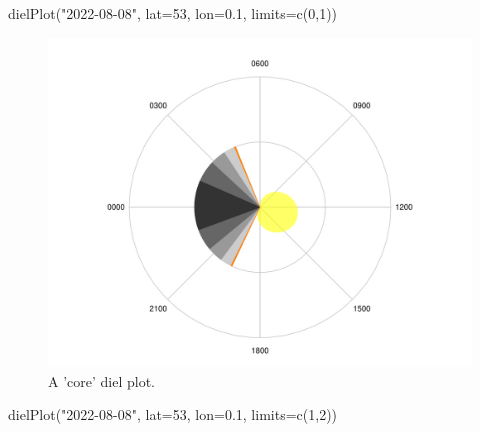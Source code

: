 \documentclass[
]{book}
\newenvironment{Shaded}{\begin{snugshade}}{\end{snugshade}}
\newcommand{\AttributeTok}[1]{\textcolor[rgb]{0.77,0.63,0.00}{#1}}
\newcommand{\DecValTok}[1]{\textcolor[rgb]{0.00,0.00,0.81}{#1}}
\newcommand{\FloatTok}[1]{\textcolor[rgb]{0.00,0.00,0.81}{#1}}
\newcommand{\FunctionTok}[1]{\textcolor[rgb]{0.00,0.00,0.00}{#1}}
\newcommand{\NormalTok}[1]{#1}
\newcommand{\StringTok}[1]{\textcolor[rgb]{0.31,0.60,0.02}{#1}}
\begin{document}
\begin{Shaded}
\begin{Highlighting}[]
\FunctionTok{dielPlot}\NormalTok{(}\StringTok{"2022{-}08{-}08"}\NormalTok{, }\AttributeTok{lat=}\DecValTok{53}\NormalTok{, }\AttributeTok{lon=}\FloatTok{0.1}\NormalTok{, }\AttributeTok{limits=}\FunctionTok{c}\NormalTok{(}\DecValTok{0}\NormalTok{,}\DecValTok{1}\NormalTok{))}
\end{Highlighting}
\end{Shaded}

\begin{figure}

{\centering \includegraphics[width=0.9\linewidth]{_main_files/figure-latex/diel-plot-core-1} 

}

\caption{A 'core' diel plot.}\label{fig:diel-plot-core}
\end{figure}

\begin{Shaded}
\begin{Highlighting}[]
\FunctionTok{dielPlot}\NormalTok{(}\StringTok{"2022{-}08{-}08"}\NormalTok{, }\AttributeTok{lat=}\DecValTok{53}\NormalTok{, }\AttributeTok{lon=}\FloatTok{0.1}\NormalTok{, }\AttributeTok{limits=}\FunctionTok{c}\NormalTok{(}\DecValTok{1}\NormalTok{,}\DecValTok{2}\NormalTok{))}
\end{Highlighting}
\end{Shaded}
\end{document}
